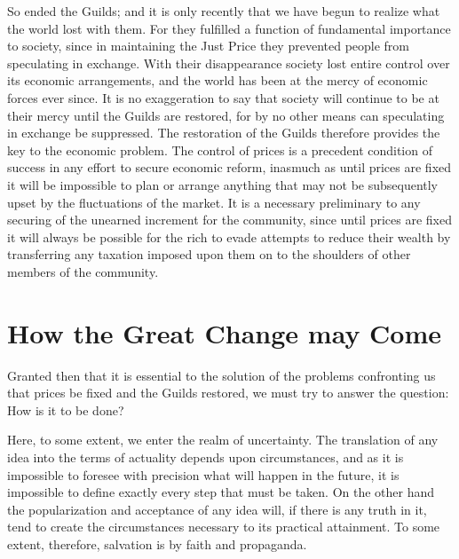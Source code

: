 \documentclass{book}
\begin{document}
So ended the Guilds; and it is only recently that we have begun to realize what the world lost with them. For they fulfilled a function of fundamental importance to society, since in maintaining the Just Price they prevented people from speculating in exchange. With their disappearance society lost entire control over its economic arrangements, and the world has been at the mercy of economic forces ever since. It is no exaggeration to say that society will continue to be at their mercy until the Guilds are restored, for by no other means can speculating in exchange be suppressed. The restoration of the Guilds therefore provides the key to the economic problem. The control of prices is a precedent condition of success in any effort to secure economic reform, inasmuch as until prices are fixed it will be impossible to plan or arrange anything that may not be subsequently upset by the fluctuations of the market. It is a necessary preliminary to any securing of the unearned increment for the community, since until prices are fixed it will always be possible for the rich to evade attempts to reduce their wealth by transferring any taxation imposed upon them on to the shoulders of other members of the community.

\chapter{How the Great Change may Come}
\label{chapter-8}
Granted then that it is essential to the solution of the problems confronting us that prices be fixed and the Guilds restored, we must try to answer the question: How is it to be done?

Here, to some extent, we enter the realm of uncertainty. The translation of any idea into the terms of actuality depends upon circumstances, and as it is impossible to foresee with precision what will happen in the future, it is impossible to define exactly every step that must be taken. On the other hand the popularization and acceptance of any idea will, if there is any truth in it, tend to create the circumstances necessary to its practical attainment. To some extent, therefore, salvation is by faith and propaganda.
\end{document}
